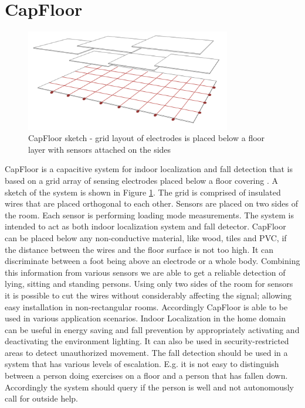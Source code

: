 \section{CapFloor}
\begin{figure}[h]
\centering
\includegraphics[width=0.8\textwidth]{images/capfloor}
\caption{CapFloor sketch - grid layout of electrodes is placed below a floor layer with sensors attached on the sides}
\label{fig:capfloor_sketch}
\end{figure}

CapFloor is a capacitive system for indoor localization and fall detection that is based on a grid array of sensing electrodes placed below a floor covering \cite{Braun2012CapFloor}. A sketch of the system is shown in Figure \ref{fig:capfloor_sketch}. The grid is comprised of insulated wires that are placed orthogonal to each other. Sensors are placed on two sides of the room. Each sensor is performing loading mode measurements. The system is intended to act as both indoor localization system and fall detector. CapFloor can be placed below any non-conductive material, like wood, tiles and PVC, if the distance between the wires and the floor surface is not too high. It can discriminate between a foot being above an electrode or a whole body. Combining this information from various sensors we are able to get a reliable detection of lying, sitting and standing persons. Using only two sides of the room for sensors it is possible to cut the wires without considerably affecting the signal; allowing easy installation in non-rectangular rooms.
Accordingly CapFloor is able to be used in various application scenarios. Indoor Localization in the home domain can be useful in energy saving and fall prevention by appropriately activating and deactivating the environment lighting. It can also be used in security-restricted areas to detect unauthorized movement. The fall detection should be used in a system that has various levels of escalation. E.g. it is not easy to distinguish between a person doing exercises on a floor and a person that has fallen down. Accordingly the system should query if the person is well and not autonomously call for outside help.
